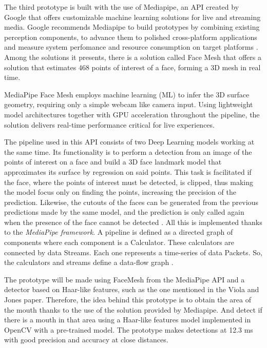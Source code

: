 The third prototype is built with the use of Mediapipe, an API created by Google that offers customizable machine learning solutions for live and streaming media.
Google recommends Mediapipe to build prototypes by combining existing perception components, to advance them to polished cross-platform applications and measure system perfomance and resource consumption on target platforms \cite{mediapipe}. Among the solutions it presents, there is a solution called Face Mesh that offers a solution that estimates 468 points of interest of a face, forming a 3D mesh in real time.

\vspace{-0.3cm}
MediaPipe Face Mesh employs machine learning (ML) to infer the 3D surface geometry, requiring only a simple webcam like camera input. Using lightweight model architectures together with GPU acceleration throughout the pipeline, the solution delivers real-time performance critical for live experiences.

\vspace{-0.3cm}
The pipeline used in this API consists of two Deep Learning models working at the same time. Its functionality is to perform a detection from an image of the points of interest on a face and build a 3D face landmark model that approximates its surface by regression on said points. This task is facilitated if the face, where the points of interest must be detected, is clipped, thus making the model focus only on finding the points, increasing the precision of the prediction. Likewise, the cutouts of the faces can be generated from the previous predictions made by the same model, and the prediction is only called again when the presence of the face cannot be detected \cite{faceMesh}. All this is implemented thanks to the \textit{MediaPipe framework}. A pipeline is defined as a directed graph of components where each component is a Calculator. These calculators are connected by data Streams. Each one represents a time-series of data Packets. So, the calculators and streams define a data-flow graph \cite{mediapipe}.

\vspace{-0.3cm}
The prototype will be made using FaceMesh from the MediaPipe API and a detector based on Haar-like features, such as the one mentioned in the Viola and Jones paper. Therefore, the idea behind this prototype is to obtain the area of the mouth thanks to the use of the solution provided by Mediapipe. And detect if there is a mouth in that area using a Haar-like features model implemented in OpenCV with a pre-trained model. The prototype makes detections at 12.3 ms with good precision and accuracy at close distances. 

